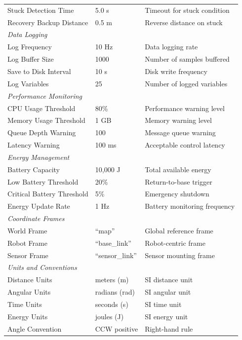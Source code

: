 \begin{table}[htbp]
\begin{tabular}{@{}lll@{}}
Stuck Detection Time & 5.0 s & Timeout for stuck condition \\
Recovery Backup Distance & 0.5 m & Reverse distance on stuck \\
\midrule
\multicolumn{3}{l}{\textit{Data Logging}} \\
Log Frequency & 10 Hz & Data logging rate \\
Log Buffer Size & 1000 & Number of samples buffered \\
Save to Disk Interval & 10 s & Disk write frequency \\
Log Variables & 25 & Number of logged variables \\
\midrule
\multicolumn{3}{l}{\textit{Performance Monitoring}} \\
CPU Usage Threshold & 80\% & Performance warning level \\
Memory Usage Threshold & 1 GB & Memory warning level \\
Queue Depth Warning & 100 & Message queue warning \\
Latency Warning & 100 ms & Acceptable control latency \\
\midrule
\multicolumn{3}{l}{\textit{Energy Management}} \\
Battery Capacity & 10,000 J & Total available energy \\
Low Battery Threshold & 20\% & Return-to-base trigger \\
Critical Battery Threshold & 5\% & Emergency shutdown \\
Energy Update Rate & 1 Hz & Battery monitoring frequency \\
\midrule
\multicolumn{3}{l}{\textit{Coordinate Frames}} \\
World Frame & ``map'' & Global reference frame \\
Robot Frame & ``base\_link'' & Robot-centric frame \\
Sensor Frame & ``sensor\_link'' & Sensor mounting frame \\
\midrule
\multicolumn{3}{l}{\textit{Units and Conventions}} \\
Distance Units & meters (m) & SI distance unit \\
Angular Units & radians (rad) & SI angular unit \\
Time Units & seconds (s) & SI time unit \\
Energy Units & joules (J) & SI energy unit \\
Angle Convention & CCW positive & Right-hand rule \\
\bottomrule
\end{tabular}
\end{table}

